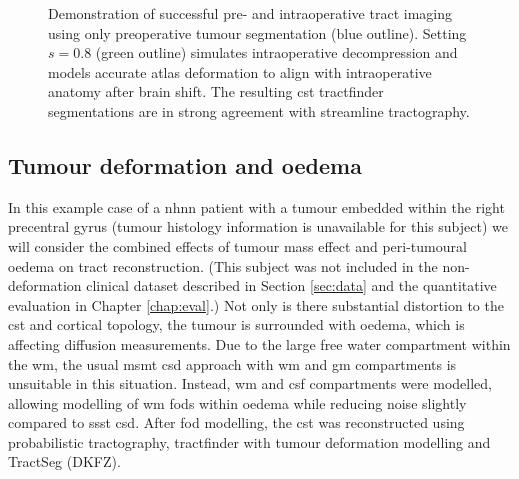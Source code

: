 \begin{figure}[h!]
  \centering
  
  \caption{Demonstration of successful pre- and intraoperative tract imaging using only preoperative tumour segmentation (blue outline). Setting $s=0.8$ (green outline) simulates intraoperative decompression and models accurate atlas deformation to align with intraoperative anatomy after brain shift. The resulting \gls{cst} tractfinder segmentations are in strong agreement with streamline tractography.}
  \label{fig:shrink}
\end{figure}

\subsection{Tumour deformation and oedema}

In this example case of a \gls{nhnn} patient with a tumour embedded within the right precentral gyrus (tumour histology information is unavailable for this subject) we will consider the combined effects of tumour mass effect and peri-tumoural oedema on tract reconstruction.
(This subject was not included in the non-deformation clinical dataset described in Section \ref{sec:data} and the quantitative evaluation in Chapter \ref{chap:eval}.)
Not only is there substantial distortion to the \gls{cst} and cortical topology, the tumour is surrounded with oedema, which is affecting diffusion measurements.
Due to the large free water compartment within the \gls{wm}, the usual \gls{msmt} \gls{csd} approach with \gls{wm} and \gls{gm} compartments is unsuitable in this situation.
Instead, \gls{wm} and \gls{csf} compartments were modelled, allowing modelling of \gls{wm} \glspl{fod} within oedema while reducing noise slightly compared to \gls{ssst} \gls{csd}.
After \gls{fod} modelling, the \gls{cst} was reconstructed using probabilistic tractography, tractfinder with tumour deformation modelling and TractSeg (DKFZ).

